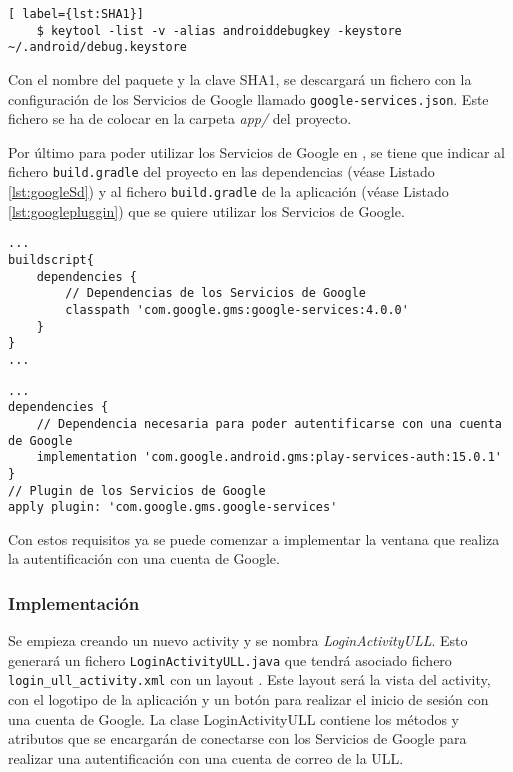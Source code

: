 \begin{lstlisting}[ label={lst:SHA1}]
    $ keytool -list -v -alias androiddebugkey -keystore ~/.android/debug.keystore
\end{lstlisting} 

Con el nombre del paquete y la clave SHA1, se descargará un fichero con la configuración de los Servicios de Google llamado \texttt{google-services.json}. Este fichero se ha de colocar en la carpeta \textit{app/} del proyecto.
 
Por último para poder utilizar los Servicios de Google en \ULLAR{}, se tiene que indicar al fichero \texttt{build.gradle} del proyecto en las dependencias (véase Listado \ref{lst:googleSd}) y al fichero \texttt{build.gradle} de la aplicación (véase Listado \ref{lst:googlepluggin}) que se quiere utilizar  los Servicios de Google.

\begin{lstlisting}[caption={Fichero \texttt{build.gradle} del proyecto, dependencias para utilizar los Servicios de Google.}, label={lst:googleSd}]
...
buildscript{
    dependencies {
        // Dependencias de los Servicios de Google
        classpath 'com.google.gms:google-services:4.0.0'
    }    
} 
...
\end{lstlisting}
 
\begin{lstlisting}[caption={Fichero \texttt{build.gradle} de la aplicación, dependencias y plugin para utilizar los Servicios de Google.}, label={lst:googlepluggin}]
...
dependencies {
    // Dependencia necesaria para poder autentificarse con una cuenta de Google
    implementation 'com.google.android.gms:play-services-auth:15.0.1'
}
// Plugin de los Servicios de Google
apply plugin: 'com.google.gms.google-services'
\end{lstlisting}

Con estos requisitos ya se puede comenzar a implementar la ventana que realiza la autentificación con una cuenta de Google. 

\subsubsection{ Implementación }


Se empieza creando un nuevo activity y se nombra \textit{LoginActivityULL}. Esto  generará un fichero \texttt{LoginActivityULL.java} que tendrá asociado fichero \texttt{login\_ull\_activity.xml} con un layout \cite{URL::layout}. Este layout será la vista del activity, con el logotipo de la aplicación y un botón para realizar el inicio de sesión con una cuenta de Google. La clase LoginActivityULL contiene los métodos y atributos que se encargarán de conectarse con los Servicios de Google para realizar una autentificación con una cuenta de correo de la ULL.


